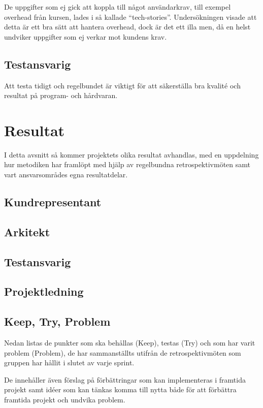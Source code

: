 \documentclass[conference,a4paper]{IEEEtran}
\begin{document}
De uppgifter som ej gick att koppla till något användarkrav, till exempel overhead från kursen, lades i så kallade ``tech-stories''. Undersökningen visade att detta är ett bra sätt att hantera overhead, dock är det ett illa men, då en helst undviker uppgifter som ej verkar mot kundens krav.

\subsection{Testansvarig}
Att testa tidigt och regelbundet är viktigt för att säkerställa bra kvalité och resultat på program- och hårdvaran. 

\section{Resultat} \label{sec:res}
I detta avsnitt så kommer projektets olika resultat avhandlas, med en uppdelning hur metodiken har framlöpt med hjälp av regelbundna retrospektivmöten samt vart ansvarsområdes egna resultatdelar.

\subsection{Kundrepresentant}

\subsection{Arkitekt}

\subsection{Testansvarig}

\subsection{Projektledning}

\subsection{Keep, Try, Problem}
Nedan listas de punkter som ska behållas (Keep), testas (Try) och som har varit problem (Problem), de har sammanställts utifrån de retrospektivmöten som gruppen har hållit i slutet av varje sprint. 

De innehåller även förslag på förbättringar som kan implementeras i framtida projekt samt idéer som kan tänkas komma till nytta både för att förbättra framtida projekt och undvika problem.
\end{document}
